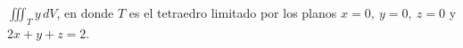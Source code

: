 \item $\iiint_T y \, dV$, en donde $T$ es el tetraedro limitado por los planos $x = 0, \ y = 0, \ z = 0$ y $2x + y + z = 2$.
